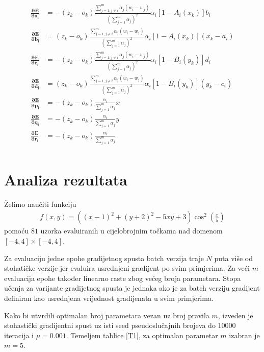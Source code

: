 \documentclass[paper=a4, fontsize=11pt]{scrartcl} %
\numberwithin{equation}{section} %
\numberwithin{figure}{section} %
\numberwithin{table}{section} %
\begin{document}
\begin{align*}
\mathbf{\frac{\partial E}{\partial a_i}} &= - (z_k - o_k) \frac{\sum_{j = 1, j \neq i}^{m} \alpha_j (w_i - w_j)}{(\sum_{j=1}^{m} \alpha_j)^2 } \alpha_i [1 - A_i(x_k)]b_i \\
\mathbf{\frac{\partial E}{\partial b_i}} &= (z_k - o_k) \frac{\sum_{j = 1, j \neq i}^{m} \alpha_j (w_i - w_j)}{(\sum_{j=1}^{m} \alpha_j)^2 } \alpha_i [1 - A_i(x_k)](x_k - a_i) \\
\mathbf{\frac{\partial E}{\partial c_i}}  &= -(z_k - o_k) \frac{\sum_{j = 1, j \neq i}^{m} \alpha_j (w_i - w_j)}{(\sum_{j=1}^{m} \alpha_j)^2 } \alpha_i [1 - B_i(y_k)]d_i \\
\mathbf{\frac{\partial E}{\partial d_i}} &= (z_k - o_k) \frac{\sum_{j = 1, j \neq i}^{m} \alpha_j (w_i - w_j)}{(\sum_{j=1}^{m} \alpha_j)^2 } \alpha_i [1 - B_i(y_k)](y_k - c_i)\\
\mathbf{\frac{\partial E}{\partial p_i}} &= - (z_k - o_k) \frac{\alpha_i}{\sum_{j=1}^{m} \alpha_j} x \\
\mathbf{\frac{\partial E}{\partial q_i}} &= - (z_k - o_k) \frac{\alpha_i}{\sum_{j=1}^{m} \alpha_j} y \\
\mathbf{\frac{\partial E}{\partial r_i}} &= - (z_k - o_k) \frac{\alpha_i}{\sum_{j=1}^{m} \alpha_j} \\
\end{align*}


\section{Analiza rezultata}
Želimo naučiti funkciju 
\begin{align*}
f(x, y) = ((x - 1) ^ 2 + (y + 2)^ 2 - 5xy + 3) {\cos^2(\frac{x}{5})}
\end{align*}
pomoću $81$ uzorka evaluiranih u cijelobrojnim točkama nad domenom $[-4, 4]\times[-4, 4]$.

Za evaluaciju jedne epohe gradijetnog spusta batch verzija traje $N$ puta više od stohatičke verzije jer evaluira usrednjeni gradijent po svim primjerima. Za veći $m$ evaluacija epohe također linearno raste zbog većeg broja parametara. Stopa učenja za varijante gradijetnog spusta je jednaka ako je za batch verziju gradijent definiran kao usrednjena vrijednost gradijenata u svim primjerima.

Kako bi utvrdili optimalan broj parametara vezan uz broj pravila $m$, izveden je stohastički gradijentni spust uz isti seed pseudoslučajnih brojeva do $10000$ iteracija i $\mu = 0.001$. Temeljem tablice \ref{T1}, za optimalan parametar $m$ izabran je $m=5$.
\end{document}
